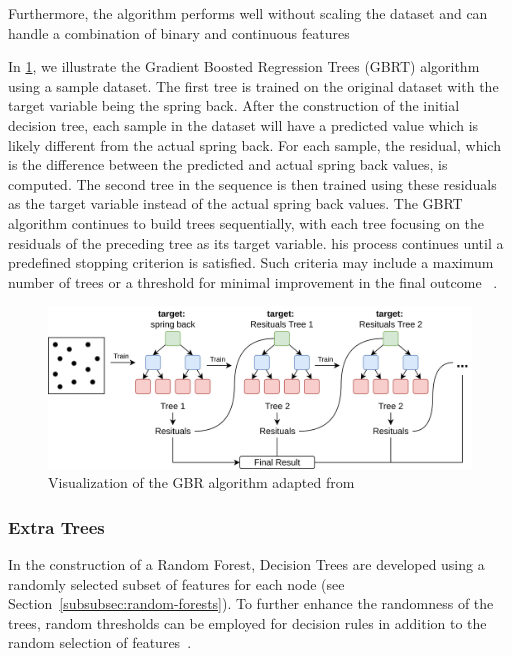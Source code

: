 Furthermore, the algorithm performs well without scaling the dataset and can handle a combination of binary and
continuous features
~\cite[p. 91]{muller2016introduction}

In \cref{fig:gbr-example}, we illustrate the Gradient Boosted Regression Trees (GBRT) algorithm using a sample
dataset.
The first tree is trained on the original dataset with the target variable being the spring back.
After the construction of the initial decision tree, each sample in the dataset will have a predicted value which is
likely
different from the actual spring back.
For each sample, the residual, which is the difference between the predicted and actual spring back values, is
computed.
The second tree in the sequence is then trained using these residuals as the target variable instead of the
actual spring back values.
The GBRT algorithm continues to build trees sequentially, with each tree focusing on the residuals of the preceding
tree as its target variable.
his process continues until a predefined stopping criterion is satisfied.
Such criteria may include a maximum number of trees or a threshold for minimal improvement in the final
outcome
~\cite[p. 227]{boehmke2019hands}.

\begin{figure}[h]
    \begin{tcolorbox}[arc=0pt,boxrule=0.5pt]
        \centering
        \includegraphics[width=1\textwidth]{chap4/images/gradient_boosting_example}
    \end{tcolorbox}
    \caption{Visualization of the \ac{GBR} algorithm adapted from~\cite[p. 222]{boehmke2019hands}}
    \label{fig:gbr-example}
\end{figure}

\subsubsection{Extra Trees}\label{subsubsec:extra-trees}
In the construction of a Random Forest, Decision Trees are developed using a randomly selected subset of features for
each node (see Section~\ref{subsubsec:random-forests}). To further enhance the randomness of the trees, random
thresholds can be employed for decision rules in addition to the random selection of
features~\cite[p. 351]{geron2022hands}.

